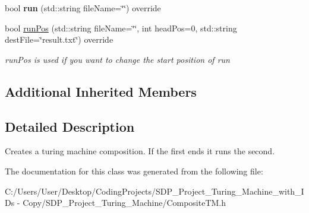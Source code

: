 \begin{DoxyCompactItemize}
\mbox{\label{class_composite_t_m_a781f52a3416aeccba0f9855783b58ffe}} 
bool {\bfseries run} (std\+::string file\+Name=\char`\"{}\char`\"{}) override
\item 
\mbox{\label{class_composite_t_m_af85d1afdb9adfcd28001e5df2c671ff0}} 
bool \mbox{\hyperlink{class_composite_t_m_af85d1afdb9adfcd28001e5df2c671ff0}{run\+Pos}} (std\+::string file\+Name=\char`\"{}\char`\"{}, int head\+Pos=0, std\+::string dest\+File=\char`\"{}result.\+txt\char`\"{}) override
\begin{DoxyCompactList}\small\item\em run\+Pos is used if you want to change the start position of run \end{DoxyCompactList}\end{DoxyCompactItemize}
\subsection*{Additional Inherited Members}


\subsection{Detailed Description}
Creates a turing machine composition. If the first ends it runs the second. 

The documentation for this class was generated from the following file\+:\begin{DoxyCompactItemize}
\item 
C\+:/\+Users/\+User/\+Desktop/\+Coding\+Projects/\+S\+D\+P\+\_\+\+Project\+\_\+\+Turing\+\_\+\+Machine\+\_\+with\+\_\+\+I\+Ds -\/ Copy/\+S\+D\+P\+\_\+\+Project\+\_\+\+Turing\+\_\+\+Machine/Composite\+T\+M.\+h\end{DoxyCompactItemize}
